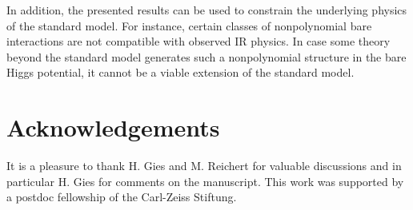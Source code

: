 \documentclass[twocolumn,aps,prd,showpacs,nofootinbib,superscriptaddress,preprintnumbers,floatfix,10pt]{revtex4-1}
\begin{document}
In addition, the presented results can be used to constrain the underlying physics of the standard model.
For instance, certain classes of nonpolynomial bare interactions are not compatible with observed IR physics.
In case some theory beyond the standard model generates such a nonpolynomial structure in the bare Higgs potential, it cannot be a viable extension of the standard model. 









\section*{Acknowledgements}
It is a pleasure to thank H. Gies and M. Reichert for valuable discussions and in particular H. Gies for comments on the manuscript. 
This work was supported by a postdoc fellowship of the Carl-Zeiss Stiftung.






\end{document}
